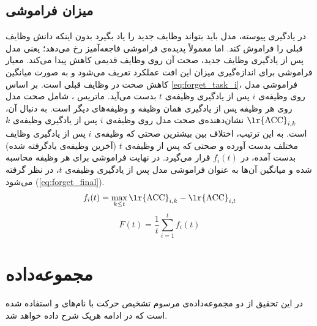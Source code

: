 \subsection{میزان فراموشی}
در یادگیری پیوسته، مدل باید بتواند وظایف جدید را یاد بگیرد بدون اینکه دانش وظایف قبلی را فراموش کند. اما معمولاً پدیده‌ی فراموشی فاجعه‌آمیز رخ می‌دهد؛ یعنی مدل پس از یادگیری وظایف جدید، صحت آن روی وظایف قدیمی کاهش پیدا می‌کند. معیار فراموشی برای اندازه‌گیری میزان این افت عملکرد تعریف می‌شود و به صورت میانگین کاهش صحت در وظایف قبلی است. بر اساس \eqref{eq:forget_task_i}، فراموشی مدل روی وظیفه‌ی $i$ پس از یادگیری وظیفه‌ی $t$ بدست می‌آید. ماتریس ، شامل صحت مدل روی هر وظیفه پس از یادگیری همان وظیفه و وظیفه‌های دیگر است. به دنبال آن، $\text{\lr{ACC}}_{i,k}$ نشان‌دهنده‌ی صحت مدل روی وظیفه‌ی $i$ پس از یادگیری وظیفه‌ی $k$ است. به این ترتیب، اختلاف بین بیشترین صحتی که وظیفه‌ی $i$ پس از یادگیری وظایف مختلف بدست آورده و صحتی که پس از وظیفه‌ی $t$ (آخرین وظیفه‌ی یادگرفته شده) بدست آمده، در $f_i(t)$ قرار می‌گیرد. در نهایت فراموشی برای هر وظیفه محاسبه شده و میانگین آن‌ها به عنوان فراموشی مدل پس از یادگیری وظیفه‌ی $t$، در نظر گرفته می‌شود (\eqref{eq:forget_final}). 
\begin{equation}\label{eq:forget_task_i}
	f_i(t) = \max_{k \le t} \text{\lr{ACC}}_{i,k} - \text{\lr{ACC}}_{i,t}
\end{equation}
\begin{equation}\label{eq:forget_final}
	F(t) = \frac{1}{t} \sum_{i=1}^{t} f_i(t) 
\end{equation}

\section{مجموعه‌داده}
در این تحقیق از دو مجموعه‌داده‌ی مرسوم تشخیص حرکت با نام‌های \cite{ucf101} و  \cite{hmdb51} استفاده شده است که در ادامه هریک شرح داده خواهد شد. 

